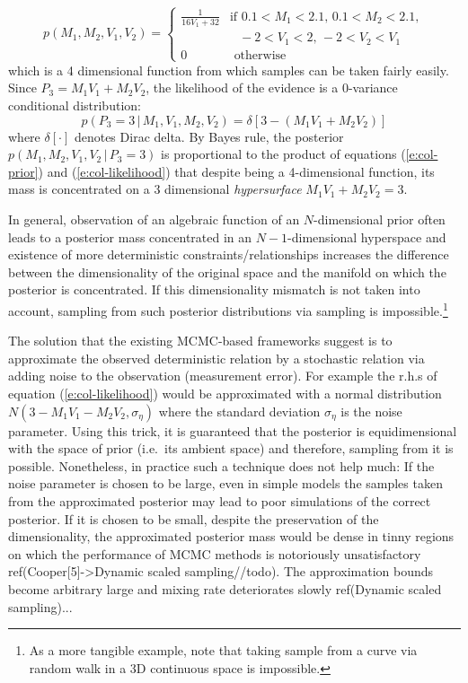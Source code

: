 \documentclass{article}
\newcommand{\otherwise}[1]{#1 &\text{ otherwise}}
\newcommand{\pr}{p}
\begin{document}
{\footnotesize
\begin{equation}  
\label{e:col-prior}
\pr(M_1, M_2, V_1, V_2)  
=
\begin{cases}
\frac{1}{16 V_1 + 32} &{\text{if }\scriptstyle 0.1<M_1<2.1, \, 0.1<M_2<2.1,}\\
							 &{\;\;\, \scriptstyle -2<V_1<2, \, -2<V_2 < V_1}\\
 \otherwise{0}
 \end{cases}
\end{equation}
}
which is a 4 dimensional function from which samples can be taken fairly easily. 
Since $P_3 = M_1 V_1 + M_2 V_2$, the likelihood of the evidence is a 0-variance conditional distribution:
\begin{equation}
\label{e:col-likelihood}
\pr(P_3 = 3 \,|\, M_1, V_1, M_2, V_2) = \delta[3 - (M_1 V_1 + M_2 V_2)]
\end{equation}
where $\delta[\cdot]$ denotes Dirac delta. 
By Bayes rule, the posterior $\pr(M_1, M_2, V_1, V_2 \,|\, P_3 = 3)$
is proportional to the product of equations (\ref{e:col-prior}) and (\ref{e:col-likelihood}) 
that despite being a 4-dimensional function, its mass is concentrated on a 3 dimensional \emph{hypersurface} {\footnotesize$M_1 V_1 + M_2 V_2 = 3$}. 

In general, observation of an algebraic function of an $N$-dimensional prior often leads to a posterior mass concentrated in an $N-1$-dimensional hyperspace and existence of more deterministic constraints/relationships increases the difference between the dimensionality of the original space and the manifold on which the posterior is concentrated.  
If this dimensionality mismatch is not taken into account, sampling from such posterior distributions via sampling is impossible.\footnote{As a more tangible example, note that taking sample from a curve via random walk in a 3D continuous space is impossible.}  

The solution that the existing MCMC-based frameworks suggest is to approximate the observed deterministic relation by a stochastic relation via adding noise to the observation (measurement error).
For example the r.h.s of equation (\ref{e:col-likelihood}) would be 
approximated with a normal distribution $N(3 - M_1 V_1 - M_2 V_2, \sigma_\eta)$  
where the standard deviation $\sigma_\eta$ is the noise parameter.
Using this trick, it is guaranteed that the posterior is equidimensional with the space of prior (i.e.\ its ambient space) and therefore, sampling from it is possible.
Nonetheless, in practice such a technique does not help much:
If the noise parameter is chosen to be large, even in simple models the samples taken from the approximated posterior may lead to poor simulations of the correct posterior.
If it is chosen to be small, despite the preservation of the dimensionality, the approximated posterior mass would be dense in tinny regions on which the performance of MCMC methods is notoriously unsatisfactory ref(Cooper[5]->Dynamic scaled sampling//todo). The approximation bounds become arbitrary large and mixing rate deteriorates slowly ref(Dynamic scaled sampling)...  
  
\end{document}
